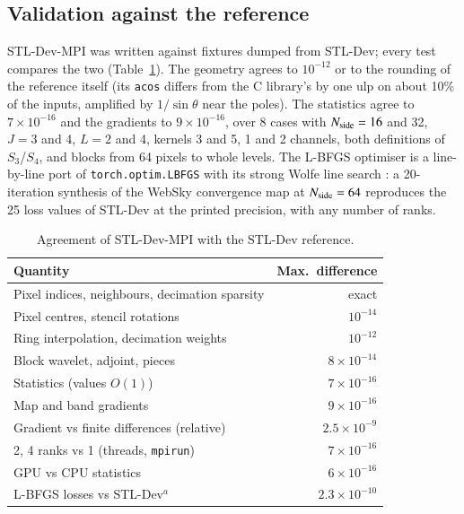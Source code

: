 \documentclass{aa}
\newcommand{\nside}{N_{\rm side}}
\begin{document}
\subsection{Validation against the reference}
\label{sec:validation}

STL-Dev-MPI was written against fixtures dumped from STL-Dev; every test compares the two (Table~\ref{tab:validation}). The geometry agrees to $10^{-12}$ or to the rounding of the reference itself (its \texttt{acos} differs from the C library's by one ulp on about 10\% of the inputs, amplified by $1/\sin\theta$ near the poles). The statistics agree to $7\times10^{-16}$ and the gradients to $9\times10^{-16}$, over 8 cases with $\nside=16$ and 32, $J=3$ and 4, $L=2$ and 4, kernels 3 and 5, 1 and 2 channels, both definitions of $S_3$/$S_4$, and blocks from 64 pixels to whole levels. The L-BFGS optimiser is a line-by-line port of \texttt{torch.optim.LBFGS} \citep{liu1989,paszke2019} with its strong Wolfe line search \citep{wolfe1969,nocedal2006}: a 20-iteration synthesis of the WebSky convergence map at $\nside=64$ reproduces the 25 loss values of STL-Dev at the printed precision, with any number of ranks.

\begin{table}
\caption{Agreement of STL-Dev-MPI with the STL-Dev reference.}
\label{tab:validation}
\centering\small
\begin{tabular}{lr}
\hline\hline
Quantity & Max.\ difference \\
\hline
Pixel indices, neighbours, decimation sparsity & exact \\
Pixel centres, stencil rotations & $10^{-14}$ \\
Ring interpolation, decimation weights & $10^{-12}$ \\
Block wavelet, adjoint, pieces & $8\times10^{-14}$ \\
Statistics (values $O(1)$) & $7\times10^{-16}$ \\
Map and band gradients & $9\times10^{-16}$ \\
Gradient vs finite differences (relative) & $2.5\times10^{-9}$ \\
2, 4 ranks vs 1 (threads, \texttt{mpirun}) & $7\times10^{-16}$ \\
GPU vs CPU statistics & $6\times10^{-16}$ \\
L-BFGS losses vs STL-Dev$^a$ & $2.3\times10^{-10}$ \\
\hline
\end{tabular}
\tablefoot{$^a$ $\nside=64$, 25 evaluations.}
\end{table}
\end{document}
